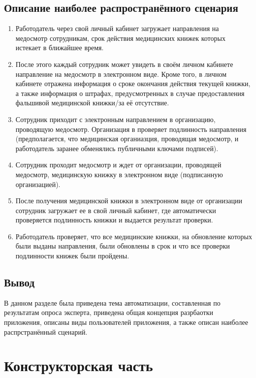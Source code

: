 \documentclass[12pt]{report}
\begin{document}
\section{Описание наиболее распространённого сценария}
\begin{enumerate}
    \item Работодатель через свой личный кабинет загружает направления на медосмотр сотрудникам, срок действия медицинских книжек которых истекает в ближайшее время. 
    \item После этого каждый сотрудник может увидеть в своём личном кабинете направление на медосмотр в электронном виде. Кроме того, в личном кабинете отражена информация о сроке окончания действия текущей книжки, а также информация о штрафах, предусмотренных в случае предоставления фальшивой медицинской книжки/за её отсутствие.
    \item Сотрудник приходит с электронным направлением в организацию, проводящую медосмотр. Организация в проверяет подлинность направления (предполагается, что медицинская органиазция, проводящая медосмотр, и работодатель заранее обменялись публичными ключами подписей).
    \item Сотрудник проходит медосмотр и ждет от организации, проводящей медосмотр, медицинскую книжку в электронном виде (подписанную организацией).
    \item После получения медицинской книжки в электронном виде от организации сотрудник загружает ее в свой личный кабинет, где автоматически проверяется подлинность книжки и выдается результат проверки.
    \item Работодатель проверяет, что все медицинские книжки, на обновление которых были выданы направления, были обновлены в срок и что все проверки подлинности книжек были пройдены.
\end{enumerate}



\section*{Вывод}
В данном разделе была приведена тема автоматизации, составленная по результатам опроса эксперта, приведена общая концепция разрбаотки приложения, описаны виды пользователей приложения, а также описан наиболее распрстранённый сценарий.


\chapter{Конструкторская часть}
\end{document}

